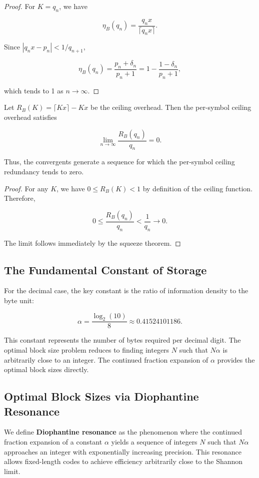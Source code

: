 \documentclass[10pt, onecolumn]{IEEEtran}
\begin{document}
\begin{proof}
For $K = q_n$, we have

\[
\eta_B(q_n) = \frac{q_n x}{\lceil q_n x\rceil}.
\]

Since $|q_n x - p_n| < 1/q_{n+1}$,

\[
\eta_B(q_n) = \frac{p_n + \delta_n}{p_n + 1} = 1 - \frac{1 - \delta_n}{p_n + 1},
\]

which tends to 1 as $n \to \infty$.
\end{proof}

\begin{corollary}
Let $R_B(K) = \lceil Kx\rceil - Kx$ be the ceiling overhead. Then the per-symbol ceiling overhead satisfies

\[
\lim_{n\to\infty} \frac{R_B(q_n)}{q_n} = 0.
\]

Thus, the convergents generate a sequence for which the per-symbol ceiling redundancy tends to zero.
\end{corollary}

\begin{proof}
For any $K$, we have $0 \le R_B(K) < 1$ by definition of the ceiling function. Therefore,

\[
0 \le \frac{R_B(q_n)}{q_n} < \frac{1}{q_n} \to 0.
\]

The limit follows immediately by the squeeze theorem.
\end{proof}

\subsection{The Fundamental Constant of Storage}

For the decimal case, the key constant is the ratio of information density to the byte unit:

\[
\alpha = \frac{\log_2(10)}{8} \approx 0.41524101186.
\]

This constant represents the number of bytes required per decimal digit. The optimal block size problem reduces to finding integers $N$ such that $N\alpha$ is arbitrarily close to an integer. The continued fraction expansion of $\alpha$ provides the optimal block sizes directly.

\subsection{Optimal Block Sizes via Diophantine Resonance}

\begin{definition}
We define \textbf{Diophantine resonance} as the phenomenon where the continued fraction expansion of a constant $\alpha$ yields a sequence of integers $N$ such that $N\alpha$ approaches an integer with exponentially increasing precision. This resonance allows fixed-length codes to achieve efficiency arbitrarily close to the Shannon limit.
\end{definition}
\end{document}

